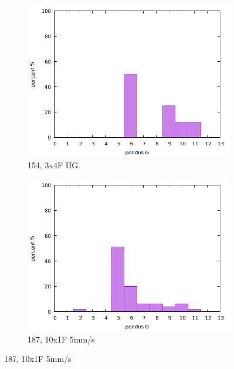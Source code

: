 \documentclass{beamer}
\begin{document}
\begin{frame}
\begin{figure}
\begin{subfigure}{.32\textwidth}
				\includegraphics[width=.99\textwidth]{../../Data/I-V/I-V_154_2021_02_23/stat.png}
				\caption{154, 3x4F HG}
			\end{subfigure}
			\begin{subfigure}{.32\textwidth}
				\includegraphics[width=.99\textwidth]{../../Data/I-V/I-V_187_2021_03_03/stat.png}
				\caption{187, 10x1F 5mm/s }
			\end{subfigure}
		\end{figure}
\end{frame}
\end{document}
